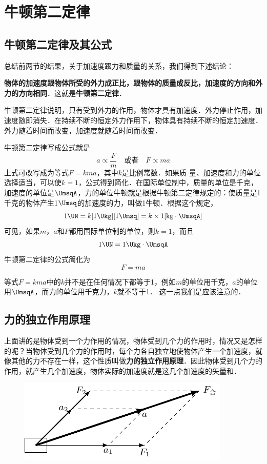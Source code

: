 \section{牛顿第二定律}
\subsection{牛顿第二定律及其公式}

总结前两节的结果，关于加速度跟力和质量的关系，我们得到下述结论：

\textbf{物体的加速度跟物体所受的外力成正比，跟物体的质量成反比，加速度的方向和外力的方向相同}．这就是\textbf{牛顿第二定律}．

牛顿第二定律说明，只有受到外力的作用，物体才具有加速度．外力停止作用，加速度随即消失．在持续不断的恒定外力作用下，物体具有持续不断的恒定加速度．外力随着时间而改变，加速度就随着时间而改变．

牛顿第二定律写成公式就是
\[a\propto \frac{F}{m}\quad \text{或者}\quad F\propto ma \]
上式可改写成为等式$F=kma$，其中$k$是比例常数．如果质
量、加速度和力的单位选择适当，可以使$k=1$，公式得到简化．在国际单位制中，质量的单位是千克，加速度的单位是$\UmsqA$，力的单位牛顿就是根据牛顿第二定律规定的：使质量是1千克的物体产生1$\Umsq$的加速度的力，叫做1牛顿．根据这个规定，
\[1 \UN=k[1\Ukg][1\Umsq]=k\times 1[{\rm kg}\cdot \UmsqA]\]
可见，如果$m$，$a$和$F$都用国际单位制的单位，则$k=1$，而且
\[1 \UN=1 \Ukg \cdot \UmsqA\]
牛顿第二定律的公式简化为
\[F=ma\]

等式$F=kma$中的$k$并不是在任何情况下都等于1，例如$m$的单位用千克，$a$的单位用$\UmsqA$，而力的单位用千克力，$k$就不等于1．
这一点我们是应该注意的．


\subsection{力的独立作用原理}
上面讲的是物体受到一个力作用的情况，物体受到几个力的作用时，情况又是怎样的呢？当物体受到几个力的作用时，每个力各自独立地使物体产生一个加速度，就像其他的力不存在一样，这个性质叫做\textbf{力的独立作用原理}．因此物体受到几个力的作用，就产生几个加速度，物体实际的加速度就是这几个加速度的矢量和．
\begin{figure}[htp]
    \centering
    \includegraphics{fig/A/3-7.pdf}
    \caption{}\label{fig_A_3-7}
\end{figure}

